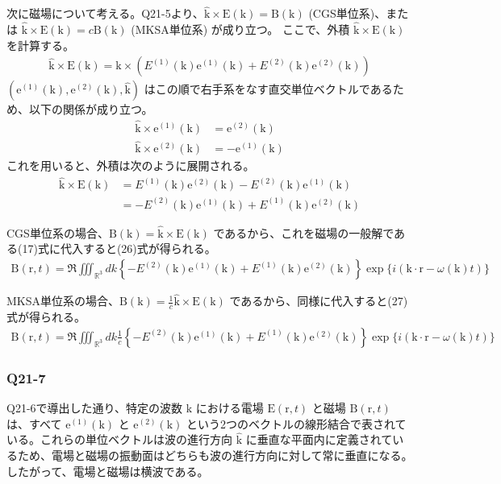 \documentclass[platex,dvipdfmx,a4paper]{jsarticle}
\newcommand{\vect}[1]{\boldsymbol{\mathrm{#1}}}
\begin{document}
  次に磁場について考える。Q21-5より、$\hat{\vect{k}} \times \vect{E}(\vect{k}) = \vect{B}(\vect{k})$ (CGS単位系)、または $\hat{\vect{k}} \times \vect{E}(\vect{k}) = c\vect{B}(\vect{k})$ (MKSA単位系) が成り立つ。
  ここで、外積 $\hat{\vect{k}} \times \vect{E}(\vect{k})$ を計算する。
  \begin{align*}
    \hat{\vect{k}} \times \vect{E}(\vect{k}) = \hat{\vect{k}} \times \left( E^{(1)}(\vect{k})\vect{e}^{(1)}(\vect{k}) + E^{(2)}(\vect{k})\vect{e}^{(2)}(\vect{k}) \right)
  \end{align*}
  $(\vect{e}^{(1)}(\vect{k}), \vect{e}^{(2)}(\vect{k}), \hat{\vect{k}})$ はこの順で右手系をなす直交単位ベクトルであるため、以下の関係が成り立つ。
  \begin{align*}
    \hat{\vect{k}} \times \vect{e}^{(1)}(\vect{k}) &= \vect{e}^{(2)}(\vect{k}) \\
    \hat{\vect{k}} \times \vect{e}^{(2)}(\vect{k}) &= -\vect{e}^{(1)}(\vect{k})
  \end{align*}
  これを用いると、外積は次のように展開される。
  \begin{align*}
    \hat{\vect{k}} \times \vect{E}(\vect{k}) &= E^{(1)}(\vect{k})\vect{e}^{(2)}(\vect{k}) - E^{(2)}(\vect{k})\vect{e}^{(1)}(\vect{k}) \\
    &= -E^{(2)}(\vect{k})\vect{e}^{(1)}(\vect{k}) + E^{(1)}(\vect{k})\vect{e}^{(2)}(\vect{k})
  \end{align*}

  CGS単位系の場合、$\vect{B}(\vect{k}) = \hat{\vect{k}} \times \vect{E}(\vect{k})$ であるから、これを磁場の一般解である(17)式に代入すると(26)式が得られる。
  \begin{align*}
    \vect{B}(\vect{r},t) = \Re \iiint_{\mathbb{R}^3} dk \left\{ -E^{(2)}(\vect{k})\vect{e}^{(1)}(\vect{k}) + E^{(1)}(\vect{k})\vect{e}^{(2)}(\vect{k}) \right\} \exp\{i(\vect{k} \cdot \vect{r} - \omega(\vect{k})t)\}
  \end{align*}

  MKSA単位系の場合、$\vect{B}(\vect{k}) = \frac{1}{c} \hat{\vect{k}} \times \vect{E}(\vect{k})$ であるから、同様に代入すると(27)式が得られる。
  \begin{align*}
    \vect{B}(\vect{r},t) = \Re \iiint_{\mathbb{R}^3} dk \frac{1}{c} \left\{ -E^{(2)}(\vect{k})\vect{e}^{(1)}(\vect{k}) + E^{(1)}(\vect{k})\vect{e}^{(2)}(\vect{k}) \right\} \exp\{i(\vect{k} \cdot \vect{r} - \omega(\vect{k})t)\}
  \end{align*}



  \subsubsection*{Q21-7}
  Q21-6で導出した通り、特定の波数 $\vect{k}$ における電場 $\vect{E}(\vect{r},t)$ と磁場 $\vect{B}(\vect{r},t)$ は、すべて $\vect{e}^{(1)}(\vect{k})$ と $\vect{e}^{(2)}(\vect{k})$ という2つのベクトルの線形結合で表されている。これらの単位ベクトルは波の進行方向 $\hat{\vect{k}}$ に垂直な平面内に定義されているため、電場と磁場の振動面はどちらも波の進行方向に対して常に垂直になる。したがって、電場と磁場は横波である。
\end{document}
